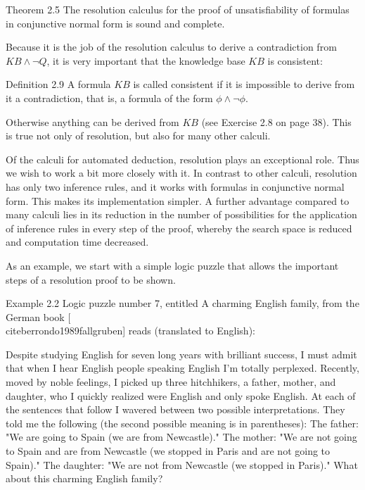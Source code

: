 \documentclass[10pt]{book}
\begin{document}
Theorem 2.5 The resolution calculus for the proof of unsatisfiability of formulas in conjunctive normal form is sound and complete.

Because it is the job of the resolution calculus to derive a contradiction from $K B \wedge \neg Q$, it is very important that the knowledge base $K B$ is consistent:

Definition 2.9 A formula $K B$ is called consistent if it is impossible to derive from it a contradiction, that is, a formula of the form $\phi \wedge \neg \phi$.

Otherwise anything can be derived from $K B$ (see Exercise 2.8 on page 38). This is true not only of resolution, but also for many other calculi.

Of the calculi for automated deduction, resolution plays an exceptional role. Thus we wish to work a bit more closely with it. In contrast to other calculi, resolution has only two inference rules, and it works with formulas in conjunctive normal form. This makes its implementation simpler. A further advantage compared to many calculi lies in its reduction in the number of possibilities for the application of inference rules in every step of the proof, whereby the search space is reduced and computation time decreased.

As an example, we start with a simple logic puzzle that allows the important steps of a resolution proof to be shown.

Example 2.2 Logic puzzle number 7, entitled A charming English family, from the German book [\\cite{berrondo1989fallgruben}] reads (translated to English):


\begin{displayquote}
Despite studying English for seven long years with brilliant success, I must admit that when I hear English people speaking English I'm totally perplexed. Recently, moved by noble feelings, I picked up three hitchhikers, a father, mother, and daughter, who I quickly realized were English and only spoke English. At each of the sentences that follow I wavered between two possible interpretations. They told me the following (the second possible meaning is in parentheses): The father: "We are going to Spain (we are from Newcastle)." The mother: "We are not going to Spain and are from Newcastle (we stopped in Paris and are not going to Spain)." The daughter: "We are not from Newcastle (we stopped in Paris)." What about this charming English family?
\end{displayquote}
\end{document}
